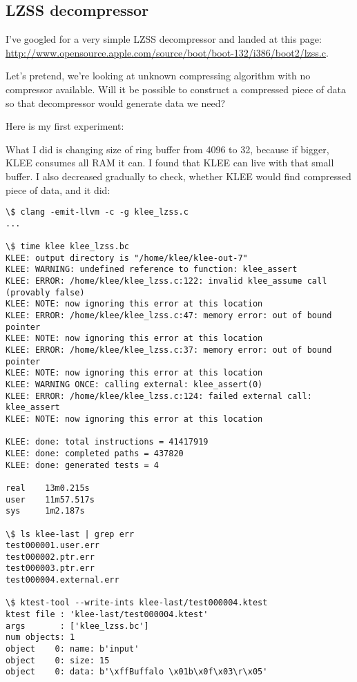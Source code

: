 \subsection{LZSS decompressor}

I've googled for a very simple LZSS decompressor and landed at this page:
\url{http://www.opensource.apple.com/source/boot/boot-132/i386/boot2/lzss.c}.

Let's pretend, we're looking at unknown compressing algorithm with no compressor available.
Will it be possible to construct a compressed piece of data so that decompressor would generate data we need?

Here is my first experiment:



What I did is changing size of ring buffer from 4096 to 32, because if bigger, KLEE consumes all RAM it can.
I found that KLEE can live with that small buffer.
I also decreased  gradually to check, whether KLEE would find compressed piece of data, and it did:

\begin{lstlisting}
\$ clang -emit-llvm -c -g klee_lzss.c
...

\$ time klee klee_lzss.bc
KLEE: output directory is "/home/klee/klee-out-7"
KLEE: WARNING: undefined reference to function: klee_assert
KLEE: ERROR: /home/klee/klee_lzss.c:122: invalid klee_assume call (provably false)
KLEE: NOTE: now ignoring this error at this location
KLEE: ERROR: /home/klee/klee_lzss.c:47: memory error: out of bound pointer
KLEE: NOTE: now ignoring this error at this location
KLEE: ERROR: /home/klee/klee_lzss.c:37: memory error: out of bound pointer
KLEE: NOTE: now ignoring this error at this location
KLEE: WARNING ONCE: calling external: klee_assert(0)
KLEE: ERROR: /home/klee/klee_lzss.c:124: failed external call: klee_assert
KLEE: NOTE: now ignoring this error at this location

KLEE: done: total instructions = 41417919
KLEE: done: completed paths = 437820
KLEE: done: generated tests = 4

real    13m0.215s
user    11m57.517s
sys     1m2.187s

\$ ls klee-last | grep err
test000001.user.err
test000002.ptr.err
test000003.ptr.err
test000004.external.err

\$ ktest-tool --write-ints klee-last/test000004.ktest
ktest file : 'klee-last/test000004.ktest'
args       : ['klee_lzss.bc']
num objects: 1
object    0: name: b'input'
object    0: size: 15
object    0: data: b'\xffBuffalo \x01b\x0f\x03\r\x05'
\end{lstlisting}

